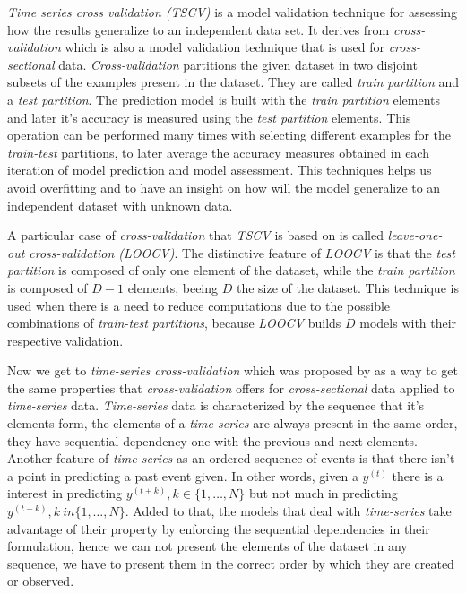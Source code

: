 \textit{Time series cross validation (TSCV)} is a model validation
technique for assessing how the results generalize to an independent
data set. It derives from \textit{cross-validation} which is also a
model validation technique that is used for \textit{cross-sectional}
data. \textit{Cross-validation} partitions the given dataset in two
disjoint subsets of the examples present in the dataset. They are
called \textit{train partition} and a \textit{test partition}. The
prediction model is built with the \textit{train partition} elements
and later it's accuracy is measured using the \textit{test partition}
elements. This operation can be performed many times with selecting
different examples for the \textit{train-test} partitions, to later
average the accuracy measures obtained in each iteration of model
prediction and model assessment. This techniques helps us avoid
overfitting and to have an insight on how will the model generalize to
an independent dataset with unknown data.

A particular case of \textit{cross-validation} that \textit{TSCV} is
based on is called \textit{leave-one-out cross-validation (LOOCV)}.
The distinctive feature of \textit{LOOCV} is that the \textit{test
partition} is composed of only one element of the dataset, while the
\textit{train partition} is composed of $D - 1$ elements, beeing $D$
the size of the dataset. This technique is used when there is a need
to reduce computations due to the possible combinations of
\textit{train-test partitions}, because \textit{LOOCV} builds $D$
models with their respective validation.

Now we get to \textit{time-series cross-validation} which was proposed
by \cite{hart1994automated} as a way to get the same properties that
\textit{cross-validation} offers for \textit{cross-sectional} data
applied to \textit{time-series} data. \textit{Time-series} data is
characterized by the sequence that it's elements form, the elements of
a \textit{time-series} are always present in the same order, they have
sequential dependency one with the previous and next elements. Another
feature of \textit{time-series} as an ordered sequence of events is
that there isn't a point in predicting a past event given. In other
words, given a $y^{(t)}$ there is a interest in predicting $y^{(t+k)},
k \in \{1,\dots,N\}$ but not much in predicting $y^{(t-k)}, k \ in
\{1, \dots, N\}$. Added to that, the models that deal with
\textit{time-series} take advantage of their property by enforcing the
sequential dependencies in their formulation, hence we can not present
the elements of the dataset in any sequence, we have to present them
in the correct order by which they are created or observed.

